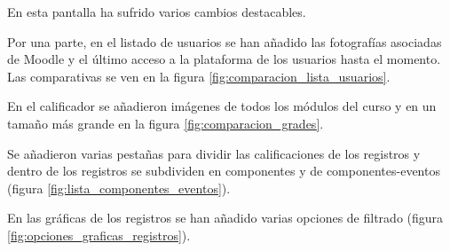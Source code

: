 En esta pantalla ha sufrido varios cambios destacables.

Por una parte, en el listado de usuarios se han añadido las fotografías asociadas de Moodle y el último acceso a la plataforma de los usuarios hasta el momento. Las comparativas se ven en la figura \ref{fig:comparacion_lista_usuarios}.


En el calificador se añadieron imágenes de todos los módulos del curso y en un tamaño más grande en la figura \ref{fig:comparacion_grades}. 

Se añadieron varias pestañas para dividir las calificaciones de los registros y dentro de los registros se subdividen en componentes y de componentes-eventos (figura \ref{fig:lista_componentes_eventos}).


En las gráficas de los registros se han añadido varias opciones de filtrado (figura \ref{fig:opciones_graficas_registros}).

